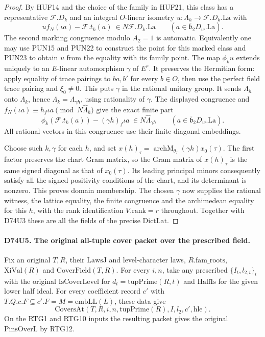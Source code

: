 \begin{proof}
By HUF14 and the choice of the family in HUF21, this class has
a representative $\mathcal F.D_k$ and an integral $O$-linear
isometry $u:\Lambda_h\to\mathcal F.D_k.\mathrm{La}$ with
\[
 u f_N(\iota a)-\mathcal F.t_k(a)\ \in N\mathcal F.D_k.\mathrm{La}
 \qquad(a\in\overline{\mathfrak b}_2D_w.\mathrm{La}).
\]
The second marking congruence modulo $A_2=1$ is automatic.
Equivalently one may use PUN15 and PUN22 to construct the point for
this marked class and PUN23 to obtain $u$ from the equality with
its family point. The map $\phi_k u$ extends uniquely to an
$E$-linear automorphism $\gamma$ of $E^r$. It preserves the
Hermitian form: apply equality of trace pairings to $ba,b'$ for
every $b\in O$, then use the perfect field trace pairing and
$\xi_0\ne0$. This puts $\gamma$ in the rational unitary group.
It sends $\Lambda_h$ onto $\Lambda_k$, hence
$\Lambda_k=\Lambda_{\gamma h}$, using rationality of $\gamma$.
The displayed congruence and
$f_N(\iota a)\equiv h_f\iota a\pmod{N\widehat\Lambda_h}$ give
the exact finite part
\[
 \phi_k(\mathcal F.t_k(a))-(\gamma h)_f\iota a\ \in
             N\widehat\Lambda_{\gamma h}
 \qquad(a\in\overline{\mathfrak b}_2D_w.\mathrm{La}).
\]
All rational vectors in this congruence use their finite diagonal
embeddings.

Choose such $k,\gamma$ for each $h$, and set
$x(h)_\tau=\operatorname{archM}_{\theta_\tau}(\gamma h)x_0(\tau)$.
The first factor preserves the chart Gram matrix, so the Gram matrix
of $x(h)_\tau$ is the same signed diagonal as that of $x_0(\tau)$.
Its leading principal minors consequently satisfy all the signed
positivity conditions of the chart, and its determinant is nonzero.
This proves domain membership. The chosen $\gamma$ now supplies
the rational witness, the lattice equality, the finite congruence
and the archimedean equality for this $h$, with the rank
identification $V.\mathrm{rank}=r$ throughout. Together with D74U3
these are all the fields of the precise $\mathrm{DictLat}$.
\end{proof}

\paragraph{D74U5. The original all-tuple cover packet over the prescribed field.}
\label{claim:D74U5}
Fix an original $T,R$, their $\mathrm{LawsJ}$ and level-character
laws, $R.\mathrm{fam\_roots}$, $\mathrm{XiVal}(R)$ and
$\mathrm{CoverField}(T,R)$. For every $i,n$, take any prescribed
$\{I_t,l_{2,t}\}_t$ with the original $\mathrm{IsCoverLevel}$ for
$d_t=\mathrm{tupPrime}(R,t)$ and $\mathrm{HalfIs}$ for the given lower
half ideal. For every coefficient record $c'$ with
$T.Q.c.F\subseteq c'.F=M=\mathrm{embLL}(L)$, these data give
\[
       \mathrm{CoversAt}(T,R,i,n,\mathrm{tupPrime}(R),I,l_2,c',
                              \mathrm{hle}).
\]
On the RTG1 and RTG10 inputs the resulting packet gives the original
$\mathrm{PinsOverL}$ by RTG12.

